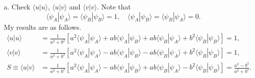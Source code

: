 \documentclass[a4paper]{book}
\newcounter{solution}[chapter]
\begin{document}
	\begin{solution}
	
	\begin{enumerate}
	
	\item[a.] Check $\langle u | u \rangle$, $\langle u | v \rangle$ and $\langle v | v \rangle$.  Note that
	\[
		\langle \psi_A | \psi_A \rangle = \langle \psi_B | \psi_B \rangle = 1, \quad \langle \psi_A | \psi_B \rangle = \langle \psi_B | \psi_A \rangle = 0.
	\]
	My results are as follows.
	\begin{align*}
		\langle u | u \rangle &= \frac{1}{ a^2+b^2 } \left[ a^2 \langle \psi_A | \psi_A \rangle + ab \langle \psi_A | \psi_B \rangle + ab \langle \psi_B | \psi_A \rangle + b^2 \langle \psi_B | \psi_B \rangle \right] = 1 , \\
		\langle v | v \rangle &= \frac{1}{ a^2+b^2 } \left[ a^2 \langle \psi_A | \psi_A \rangle - ab \langle \psi_A | \psi_B \rangle - ab \langle \psi_B | \psi_A \rangle + b^2 \langle \psi_B | \psi_B \rangle \right] = 1 , \\
		S \equiv \langle u | v \rangle &= \frac{1}{ a^2+b^2 } \left[ a^2 \langle \psi_A | \psi_A \rangle - ab \langle \psi_A | \psi_B \rangle + ab \langle \psi_B | \psi_A \rangle - b^2 \langle \psi_B | \psi_B \rangle \right] = \frac{ a^2 - b^2 }{ a^2 + b^2 }.
	\end{align*}
		

\end{enumerate}
\end{solution}
\end{document}
